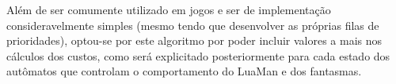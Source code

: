 \documentclass[a4paper]{scrartcl}
\begin{document}
Além de ser comumente utilizado em jogos e ser  de implementação consideravelmente simples
(mesmo tendo que desenvolver as próprias filas de prioridades), optou-se por este algoritmo por
poder incluir valores a mais nos cálculos dos custos, como será explicitado posteriormente para
cada estado dos autômatos que controlam o comportamento do LuaMan e dos fantasmas.

%
%
%
%
%
%
%
%
%
\end{document}
